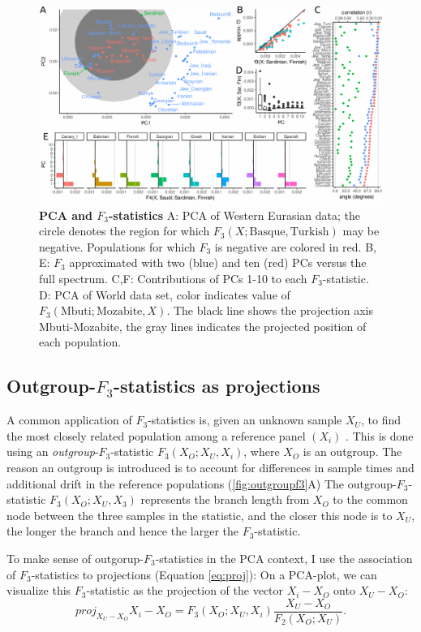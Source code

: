 \documentclass[12pt,fullpage, a4paper]{article}
\newcommand{\vectorproj}[2][]{\textit{proj}_{#1}#2}
\begin{document}
\begin{figure}[!ht]
	\includegraphics[width=\textwidth]{figures/fig_data_europe.pdf}
	\caption{\textbf{PCA and $F_3$-statistics} A: PCA of Western Eurasian data; the circle denotes the region for which $F_3(X; \text{Basque}, \text{Turkish})$ may be negative. Populations for which $F_3$ is negative are colored in red. B, E: $F_3$ approximated with two (blue) and ten (red) PCs versus the full spectrum. C,F: Contributions of PCs 1-10 to each $F_3$-statistic. D: PCA of World data set, color indicates value of $F_3(\text{Mbuti}; \text{Mozabite}, X)$. The black line shows the projection axis Mbuti-Mozabite, the gray lines indicates the projected position of each population. }
	\label{fig:f3}
\end{figure}

\subsection{Outgroup-$F_3$-statistics as projections}
A common application of $F_3$-statistics is, given an unknown sample $X_U$, to find the most closely related population among a reference panel $(X_i)$ \citep{raghavan2014}. This is done  using an \emph{outgroup}-$F_3$-statistic $F_3(X_O; X_U, X_i)$, where $X_O$ is an outgroup. The reason an outgroup is introduced is to account for differences in sample times and additional drift in the reference populations (\ref{fig:outgroupf3}A) The outgroup-$F_3$-statistic $F_3(X_O; X_U, X_3)$ represents the branch length from $X_O$ to the common node between the three samples in the statistic, and the closer this node is to $X_U$, the longer the branch and hence the larger the $F_3$-statistic. 

To make sense of outgorup-$F_3$-statistics in the PCA context, I use the association of $F_3$-statistics to projections (Equation \ref{eq:proj}):
On a PCA-plot, we can visualize this $F_3$-statistic as the projection of the vector $X_i - X_O$ onto $X_U - X_O$: 
$$\vectorproj[X_U - X_O]{X_i - X_O} =F_3(X_O; X_U, X_i) \frac{X_U - X_O}{F_2(X_O; X_U)}.$$
\end{document}
